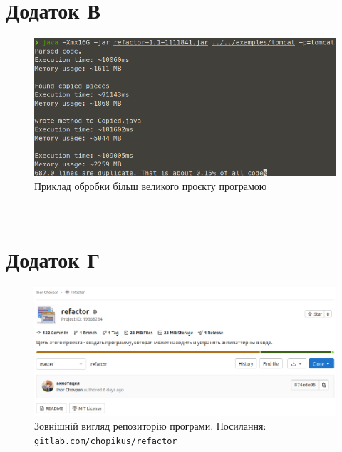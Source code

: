 \documentclass[a4paper, 14pt]{article}
\begin{document}
\section*{Додаток В}
\begin{figure}[h]
    \centering
    \includegraphics[width=\textwidth]{add3}
    \caption{\centering Приклад обробки більш великого проєкту програмою}
\end{figure} \hfill \\
\section*{Додаток Г}
\begin{figure}[h]
    \centering
    \includegraphics[width=\textwidth]{add-gitlab}
    \caption{\centering Зовнішній вигляд репозиторію програми. \protect\linebreak Посилання: \texttt{gitlab.com/chopikus/refactor} }
\end{figure} \hfill \\
\end{document}
